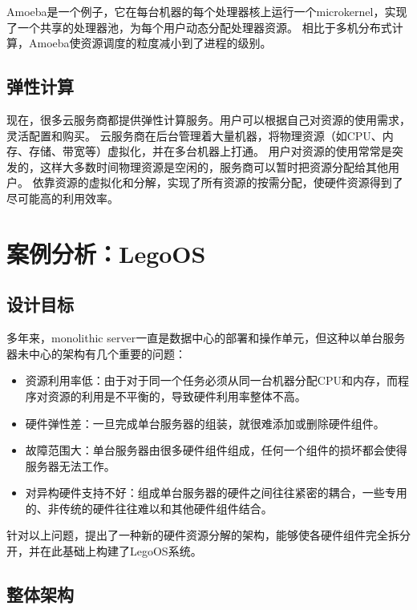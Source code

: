 Amoeba\parencite{tanenbaum1991amoeba}是一个例子，它在每台机器的每个处理器核上运行一个microkernel，实现了一个共享的处理器池，为每个用户动态分配处理器资源。
相比于多机分布式计算，Amoeba使资源调度的粒度减小到了进程的级别。

\subsection{弹性计算}

现在，很多云服务商都提供弹性计算服务。用户可以根据自己对资源的使用需求，灵活配置和购买。
云服务商在后台管理着大量机器，将物理资源（如CPU、内存、存储、带宽等）虚拟化，并在多台机器上打通。
用户对资源的使用常常是突发的，这样大多数时间物理资源是空闲的，服务商可以暂时把资源分配给其他用户。
依靠资源的虚拟化和分解，实现了所有资源的按需分配，使硬件资源得到了尽可能高的利用效率。


\section{案例分析：LegoOS}

\subsection{设计目标}

多年来，monolithic server一直是数据中心的部署和操作单元，但这种以单台服务器未中心的架构有几个重要的问题：
\begin{itemize}
\item 资源利用率低：由于对于同一个任务必须从同一台机器分配CPU和内存，而程序对资源的利用是不平衡的，导致硬件利用率整体不高。
\item 硬件弹性差：一旦完成单台服务器的组装，就很难添加或删除硬件组件。
\item 故障范围大：单台服务器由很多硬件组件组成，任何一个组件的损坏都会使得服务器无法工作。
\item 对异构硬件支持不好：组成单台服务器的硬件之间往往紧密的耦合，一些专用的、非传统的硬件往往难以和其他硬件组件结合。
\end{itemize}

针对以上问题，提出了一种新的硬件资源分解的架构，能够使各硬件组件完全拆分开，并在此基础上构建了LegoOS系统。

\subsection{整体架构}

